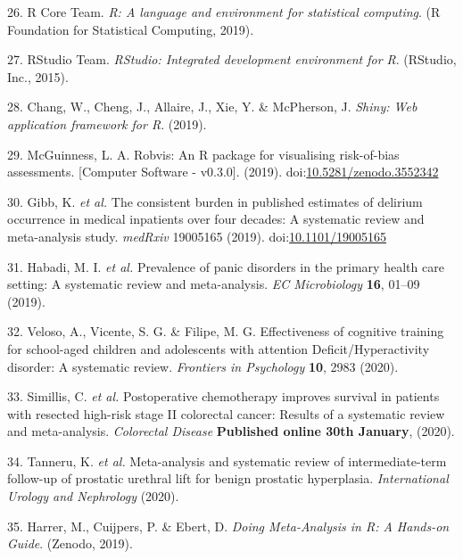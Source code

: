 \documentclass[a4paper, nobind]{templates/ociamthesis}
\begin{document}
\leavevmode\hypertarget{ref-rref}{}%
26. R Core Team. \emph{R: A language and environment for statistical computing}. (R Foundation for Statistical Computing, 2019).

\leavevmode\hypertarget{ref-rstudioref}{}%
27. RStudio Team. \emph{RStudio: Integrated development environment for R}. (RStudio, Inc., 2015).

\leavevmode\hypertarget{ref-shinyref}{}%
28. Chang, W., Cheng, J., Allaire, J., Xie, Y. \& McPherson, J. \emph{Shiny: Web application framework for R}. (2019).

\leavevmode\hypertarget{ref-mcguinness2019a}{}%
29. McGuinness, L. A. Robvis: An R package for visualising risk-of-bias assessments. {[}Computer Software - v0.3.0{]}. (2019). doi:\href{https://doi.org/10.5281/zenodo.3552342}{10.5281/zenodo.3552342}

\leavevmode\hypertarget{ref-gibb2019consistent}{}%
30. Gibb, K. \emph{et al.} The consistent burden in published estimates of delirium occurrence in medical inpatients over four decades: A systematic review and meta-analysis study. \emph{medRxiv} 19005165 (2019). doi:\href{https://doi.org/10.1101/19005165}{10.1101/19005165}

\leavevmode\hypertarget{ref-habadi2019prevalence}{}%
31. Habadi, M. I. \emph{et al.} Prevalence of panic disorders in the primary health care setting: A systematic review and meta-analysis. \emph{EC Microbiology} \textbf{16}, 01--09 (2019).

\leavevmode\hypertarget{ref-veloso2020effectiveness}{}%
32. Veloso, A., Vicente, S. G. \& Filipe, M. G. Effectiveness of cognitive training for school-aged children and adolescents with attention Deficit/Hyperactivity disorder: A systematic review. \emph{Frontiers in Psychology} \textbf{10}, 2983 (2020).

\leavevmode\hypertarget{ref-simillis2020}{}%
33. Simillis, C. \emph{et al.} Postoperative chemotherapy improves survival in patients with resected high-risk stage II colorectal cancer: Results of a systematic review and meta-analysis. \emph{Colorectal Disease} \textbf{Published online 30th January}, (2020).

\leavevmode\hypertarget{ref-tanneru2020}{}%
34. Tanneru, K. \emph{et al.} Meta-analysis and systematic review of intermediate-term follow-up of prostatic urethral lift for benign prostatic hyperplasia. \emph{International Urology and Nephrology} (2020).

\leavevmode\hypertarget{ref-mathias_harrer_2019_2551803}{}%
35. Harrer, M., Cuijpers, P. \& Ebert, D. \emph{Doing Meta-Analysis in R: A Hands-on Guide}. (Zenodo, 2019).
\end{document}

